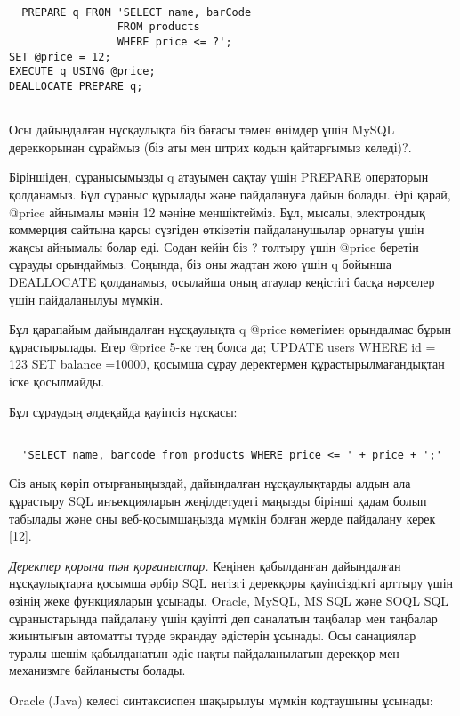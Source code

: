\begin{verbatim}

  PREPARE q FROM 'SELECT name, barCode 
                 FROM products 
                 WHERE price <= ?';
SET @price = 12;
EXECUTE q USING @price;
DEALLOCATE PREPARE q;
  
\end{verbatim}
\begin{multicols}{2}

Осы дайындалған нұсқаулықта біз бағасы төмен өнімдер үшін MySQL
дерекқорынан сұраймыз (біз аты мен штрих кодын қайтарғымыз келеді)?.

Біріншіден, сұранысымызды q атауымен сақтау үшін PREPARE операторын
қолданамыз. Бұл сұраныс құрылады және пайдалануға дайын болады. Әрі
қарай, @price айнымалы мәнін 12 мәніне меншіктейміз. Бұл, мысалы,
электрондық коммерция сайтына қарсы сүзгіден өткізетін пайдаланушылар
орнатуы үшін жақсы айнымалы болар еді. Содан кейін біз ? толтыру үшін
@price беретін сұрауды орындаймыз. Соңында, біз оны жадтан жою үшін q
бойынша DEALLOCATE қолданамыз, осылайша оның атаулар кеңістігі басқа
нәрселер үшін пайдаланылуы мүмкін.

Бұл қарапайым дайындалған нұсқаулықта q @price көмегімен орындалмас
бұрын құрастырылады. Егер @price 5-ке тең болса да; UPDATE users WHERE
id = 123 SET balance =10000, қосымша сұрау деректермен
құрастырылмағандықтан іске қосылмайды.

Бұл сұраудың әлдеқайда қауіпсіз нұсқасы:
\end{multicols}
\begin{verbatim}

  'SELECT name, barcode from products WHERE price <= ' + price + ';'

\end{verbatim}
\begin{multicols}{2}

Сіз анық көріп отырғаныңыздай, дайындалған нұсқаулықтарды алдын ала
құрастыру SQL инъекцияларын жеңілдетудегі маңызды бірінші қадам болып
табылады және оны веб-қосымшаңызда мүмкін болған жерде пайдалану керек
{[}12{]}.

\emph{Деректер қорына тән қорғаныстар.} Кеңінен қабылданған дайындалған
нұсқаулықтарға қосымша әрбір SQL негізгі дерекқоры қауіпсіздікті арттыру
үшін өзінің жеке функцияларын ұсынады. Oracle, MySQL, MS SQL және SOQL
SQL сұраныстарында пайдалану үшін қауіпті деп саналатын таңбалар мен
таңбалар жиынтығын автоматты түрде экрандау әдістерін ұсынады. Осы
санациялар туралы шешім қабылданатын әдіс нақты пайдаланылатын дерекқор
мен механизмге байланысты болады.

Oracle (Java) келесі синтаксиспен шақырылуы мүмкін кодтаушыны ұсынады:
\end{multicols}
